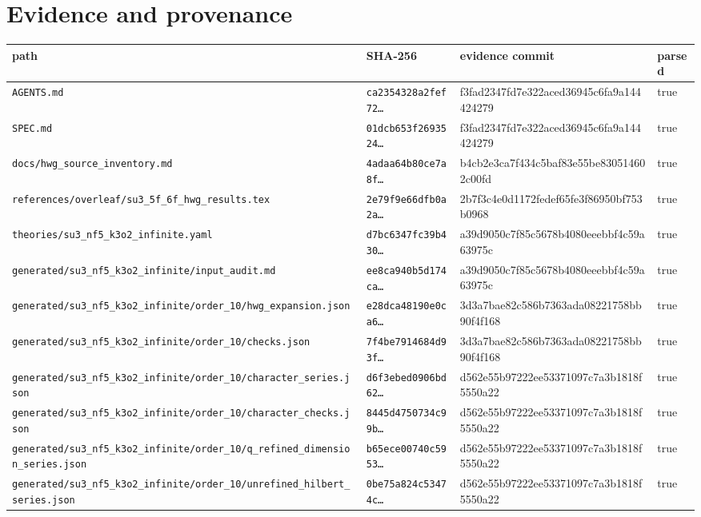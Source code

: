 \documentclass[11pt]{article}
\newcommand{\RawPath}[1]{\texttt{#1}}
\begin{document}
\section{Evidence and provenance}
\begin{longtable}{p{5cm}p{3.2cm}p{3.2cm}l}\toprule path & SHA-256 & evidence commit & parsed\\\midrule\endhead
\RawPath{AGENTS.md} & \texttt{ca2354328a2fef72\ldots} & f3fad2347fd7e322aced36945c6fa9a144424279 & true\\
\RawPath{SPEC.md} & \texttt{01dcb653f2693524\ldots} & f3fad2347fd7e322aced36945c6fa9a144424279 & true\\
\RawPath{docs/hwg\_source\_inventory.md} & \texttt{4adaa64b80ce7a8f\ldots} & b4cb2e3ca7f434c5baf83e55be830514602c00fd & true\\
\RawPath{references/overleaf/su3\_5f\_6f\_hwg\_results.tex} & \texttt{2e79f9e66dfb0a2a\ldots} & 2b7f3c4e0d1172fedef65fe3f86950bf753b0968 & true\\
\RawPath{theories/su3\_nf5\_k3o2\_infinite.yaml} & \texttt{d7bc6347fc39b430\ldots} & a39d9050c7f85c5678b4080eeebbf4c59a63975c & true\\
\RawPath{generated/su3\_nf5\_k3o2\_infinite/input\_audit.md} & \texttt{ee8ca940b5d174ca\ldots} & a39d9050c7f85c5678b4080eeebbf4c59a63975c & true\\
\RawPath{generated/su3\_nf5\_k3o2\_infinite/order\_10/hwg\_expansion.json} & \texttt{e28dca48190e0ca6\ldots} & 3d3a7bae82c586b7363ada08221758bb90f4f168 & true\\
\RawPath{generated/su3\_nf5\_k3o2\_infinite/order\_10/checks.json} & \texttt{7f4be7914684d93f\ldots} & 3d3a7bae82c586b7363ada08221758bb90f4f168 & true\\
\RawPath{generated/su3\_nf5\_k3o2\_infinite/order\_10/character\_series.json} & \texttt{d6f3ebed0906bd62\ldots} & d562e55b97222ee53371097c7a3b1818f5550a22 & true\\
\RawPath{generated/su3\_nf5\_k3o2\_infinite/order\_10/character\_checks.json} & \texttt{8445d4750734c99b\ldots} & d562e55b97222ee53371097c7a3b1818f5550a22 & true\\
\RawPath{generated/su3\_nf5\_k3o2\_infinite/order\_10/q\_refined\_dimension\_series.json} & \texttt{b65ece00740c5953\ldots} & d562e55b97222ee53371097c7a3b1818f5550a22 & true\\
\RawPath{generated/su3\_nf5\_k3o2\_infinite/order\_10/unrefined\_hilbert\_series.json} & \texttt{0be75a824c53474c\ldots} & d562e55b97222ee53371097c7a3b1818f5550a22 & true\\

\end{longtable}
\end{document}
